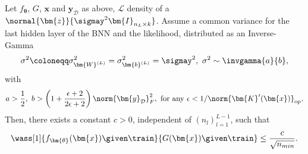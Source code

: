 \begin{theorem} \label{thm:studposterior}
    Let $f_{\bm{\theta}}$, $G$, $\bm{x}$ and $\bm{y}_{\mathcal{D}}$ as above, $\mathcal{L}$ density of a $\normal{\bm{z}}{\sigmay^2 \bm{I}_{n_L \times k}}$. Assume a common variance for the last hidden layer of the BNN and the likelihood, distributed as an Inverse-Gamma 
    \begin{equation*}
        \sigma^2 \coloneqq \sigma_{\bm{W}^{(L)}}^2 = \sigma_{\bm{b}^{(L)}}^2 = \sigmay^2, \ \sigma^2 \sim \invgamma{a}{b},
    \end{equation*}
    with
    \begin{equation} \label{eq:abconstr}
        a > \frac{1}{2}, \ b > \left(1 + \frac{\epsilon + 2}{2\epsilon + 2}\right) \norm{\bm{y}_{\mathcal{D}}}_F^2, \text{ for any } \epsilon < 1/\norm{\bm{K}'(\bm{x})}_{\mathrm{op}}. 
    \end{equation}
    Then, there exists a constant $c > 0$, independent of $\left(n_l\right)_{l = 1}^{L - 1}$, such that
    \begin{equation*}
        \wass[1]{f_{\bm{\theta}}(\bm{x}) \given \train}{G(\bm{x}) \given \train} \leq \frac{c}{\sqrt{n_{min}}}.
    \end{equation*}
\end{theorem}
